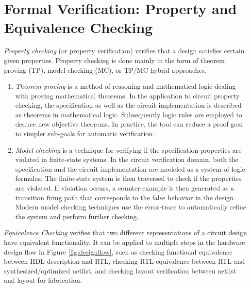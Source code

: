 \section{Formal Verification: Property and Equivalence Checking}


{\it Property checking} (or property verification) verifies
that a design satisfies certain given properties. Property checking is done mainly 
in the form of theorem proving (TP), model checking (MC), or TP/MC hybrid approaches.
\begin{enumerate}[{1)}]
\item \emph{Theorem proving} \cite{theoremproving:91} 
is a method of reasoning and mathematical logic dealing with proving 
mathematical theorems. In the application to circuit property checking, 
the specification as well as the circuit implementation
is described as theorems in mathematical logic. Subsequently logic rules
are employed to deduce new objective theorems. In practice, the tool can reduce
a proof goal to simpler sub-goals for automatic verification.

\item \emph{Model checking} \cite{modelcheck:99} is a technique 
for verifying if the specification properties are violated in finite-state systems. In the circuit verification 
domain, both the specification and the circuit implementation are modeled as a system of 
logic formulas. The finite-state system is then traversed to check if the 
properties are violated. If violation occurs, 
a counter-example is then generated as a transition firing path that corresponds to the
false behavior in the design. 
Modern model checking techniques use the error-trace to automatically refine
the system and perform further checking.
\end{enumerate}

{\it Equivalence Checking} verifies that two different representations of
a circuit design have equivalent functionality. It can be applied to 
multiple steps in the hardware design flow in Figure \ref{fig:designflow},
such as checking functional equivalence between HDL description and RTL,
checking RTL equivalence between RTL and synthesized/optimized netlist, 
and checking layout verification between netlist and layout for fabrication.

